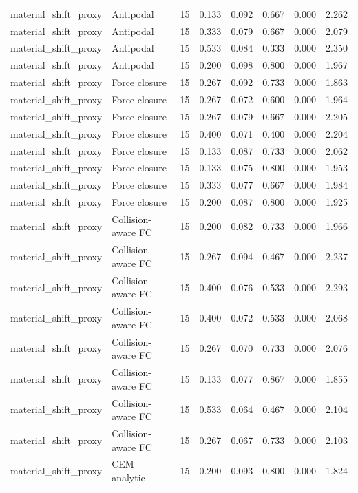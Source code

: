 {\begin{longtable}{llrrrrrr}
material\_shift\_proxy & Antipodal & 15 & 0.133 & 0.092 & 0.667 & 0.000 & 2.262 \\
material\_shift\_proxy & Antipodal & 15 & 0.333 & 0.079 & 0.667 & 0.000 & 2.079 \\
material\_shift\_proxy & Antipodal & 15 & 0.533 & 0.084 & 0.333 & 0.000 & 2.350 \\
material\_shift\_proxy & Antipodal & 15 & 0.200 & 0.098 & 0.800 & 0.000 & 1.967 \\
material\_shift\_proxy & Force closure & 15 & 0.267 & 0.092 & 0.733 & 0.000 & 1.863 \\
material\_shift\_proxy & Force closure & 15 & 0.267 & 0.072 & 0.600 & 0.000 & 1.964 \\
material\_shift\_proxy & Force closure & 15 & 0.267 & 0.079 & 0.667 & 0.000 & 2.205 \\
material\_shift\_proxy & Force closure & 15 & 0.400 & 0.071 & 0.400 & 0.000 & 2.204 \\
material\_shift\_proxy & Force closure & 15 & 0.133 & 0.087 & 0.733 & 0.000 & 2.062 \\
material\_shift\_proxy & Force closure & 15 & 0.133 & 0.075 & 0.800 & 0.000 & 1.953 \\
material\_shift\_proxy & Force closure & 15 & 0.333 & 0.077 & 0.667 & 0.000 & 1.984 \\
material\_shift\_proxy & Force closure & 15 & 0.200 & 0.087 & 0.800 & 0.000 & 1.925 \\
material\_shift\_proxy & Collision-aware FC & 15 & 0.200 & 0.082 & 0.733 & 0.000 & 1.966 \\
material\_shift\_proxy & Collision-aware FC & 15 & 0.267 & 0.094 & 0.467 & 0.000 & 2.237 \\
material\_shift\_proxy & Collision-aware FC & 15 & 0.400 & 0.076 & 0.533 & 0.000 & 2.293 \\
material\_shift\_proxy & Collision-aware FC & 15 & 0.400 & 0.072 & 0.533 & 0.000 & 2.068 \\
material\_shift\_proxy & Collision-aware FC & 15 & 0.267 & 0.070 & 0.733 & 0.000 & 2.076 \\
material\_shift\_proxy & Collision-aware FC & 15 & 0.133 & 0.077 & 0.867 & 0.000 & 1.855 \\
material\_shift\_proxy & Collision-aware FC & 15 & 0.533 & 0.064 & 0.467 & 0.000 & 2.104 \\
material\_shift\_proxy & Collision-aware FC & 15 & 0.267 & 0.067 & 0.733 & 0.000 & 2.103 \\
material\_shift\_proxy & CEM analytic & 15 & 0.200 & 0.093 & 0.800 & 0.000 & 1.824 \\

\end{longtable}}
